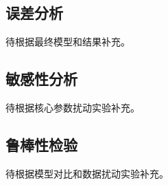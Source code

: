 \subsection{误差分析}\label{sub:6.1}

待根据最终模型和结果补充。

\subsection{敏感性分析}\label{sub:6.2}

待根据核心参数扰动实验补充。

\subsection{鲁棒性检验}\label{sub:6.3}

待根据模型对比和数据扰动实验补充。

